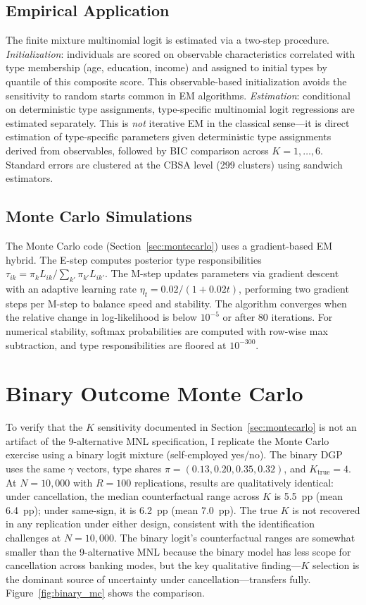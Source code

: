 \documentclass[12pt]{article}
\begin{document}
\subsection{Empirical Application}

The finite mixture multinomial logit is estimated via a two-step procedure. \textit{Initialization}: individuals are scored on observable characteristics correlated with type membership (age, education, income) and assigned to initial types by quantile of this composite score. This observable-based initialization avoids the sensitivity to random starts common in EM algorithms. \textit{Estimation}: conditional on deterministic type assignments, type-specific multinomial logit regressions are estimated separately. This is \textit{not} iterative EM in the classical sense---it is direct estimation of type-specific parameters given deterministic type assignments derived from observables, followed by BIC comparison across $K = 1, \ldots, 6$. Standard errors are clustered at the CBSA level (299 clusters) using sandwich estimators.

\subsection{Monte Carlo Simulations}

The Monte Carlo code (Section~\ref{sec:montecarlo}) uses a gradient-based EM hybrid. The E-step computes posterior type responsibilities $\tau_{ik} = \pi_k L_{ik} / \sum_{k'} \pi_{k'} L_{ik'}$. The M-step updates parameters via gradient descent with an adaptive learning rate $\eta_t = 0.02 / (1 + 0.02t)$, performing two gradient steps per M-step to balance speed and stability. The algorithm converges when the relative change in log-likelihood is below $10^{-5}$ or after 80 iterations. For numerical stability, softmax probabilities are computed with row-wise max subtraction, and type responsibilities are floored at $10^{-300}$.


\section{Binary Outcome Monte Carlo}
\label{app:binary_mc}

To verify that the $K$ sensitivity documented in Section~\ref{sec:montecarlo} is not an artifact of the 9-alternative MNL specification, I replicate the Monte Carlo exercise using a binary logit mixture (self-employed yes/no). The binary DGP uses the same $\gamma$ vectors, type shares $\pi = (0.13, 0.20, 0.35, 0.32)$, and $K_{\text{true}} = 4$. At $N = 10{,}000$ with $R = 100$ replications, results are qualitatively identical: under cancellation, the median counterfactual range across $K$ is 5.5~pp (mean 6.4~pp); under same-sign, it is 6.2~pp (mean 7.0~pp). The true $K$ is not recovered in any replication under either design, consistent with the identification challenges at $N = 10{,}000$. The binary logit's counterfactual ranges are somewhat smaller than the 9-alternative MNL because the binary model has less scope for cancellation across banking modes, but the key qualitative finding---$K$ selection is the dominant source of uncertainty under cancellation---transfers fully. Figure~\ref{fig:binary_mc} shows the comparison.
\end{document}
